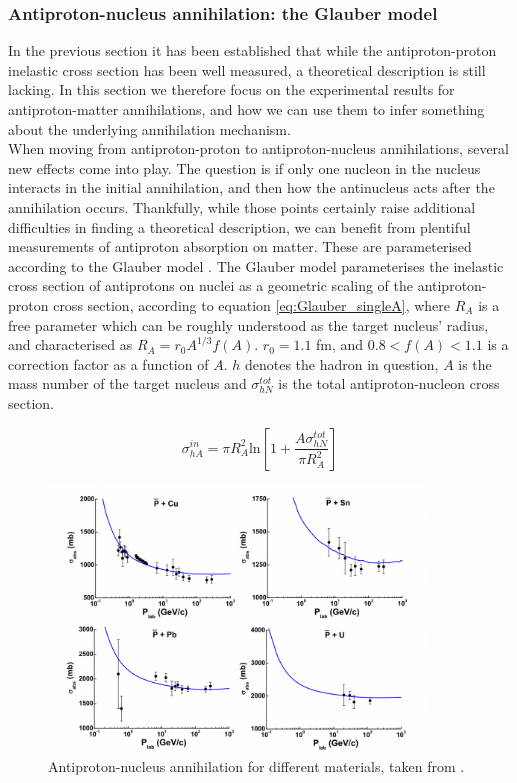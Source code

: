\subsubsection{Antiproton-nucleus annihilation: the Glauber model}\label{sec:Intro:Glauber}
In the previous section it has been established that while the antiproton-proton inelastic cross section has been well measured, a theoretical description is still lacking. In this section we therefore focus on the experimental results for antiproton-matter annihilations, and how we can use them to infer something about the underlying annihilation mechanism. \\

When moving from antiproton-proton to antiproton-nucleus annihilations, several new effects come into play. The question is if only one nucleon in the nucleus interacts in the initial annihilation, and then how the antinucleus acts after the annihilation occurs. Thankfully, while those points certainly raise additional difficulties in finding a theoretical description, we can benefit from plentiful measurements of antiproton absorption on matter. These are parameterised according to the Glauber model \cite{Glauber_original, glauber_model_geant4_scaling, Antinucleus-nucleus_Geant4}. The Glauber model parameterises the inelastic cross section of antiprotons on nuclei as a geometric scaling of the antiproton-proton cross section, according to equation \ref{eq:Glauber_singleA}, where $R_A$ is a free parameter which can be roughly understood as the target nucleus' radius, and characterised as $R_A = r_0 A^{1/3}f(A)$. $r_0=1.1$ fm, and $0.8<f(A)<1.1$ is a correction factor as a function of $A$. $h$ denotes the hadron in question, $A$ is the mass number of the target nucleus and $\sigma_{hN}^{tot}$ is the total antiproton-nucleon cross section. 

\begin{equation}\label{eq:Glauber_singleA}
    \sigma_{hA}^{in} = \pi R_A^2 \mathrm{ln}\left[ 1+\frac{A\sigma_{hN}^{tot}}{\pi R_A^2}\right]
\end{equation}

\begin{figure}
    \centering
    \includegraphics[width=0.9\textwidth]{figures/pbar_annihilation_diff_materials.png}
    \caption{Antiproton-nucleus annihilation for different materials, taken from \cite{Antinucleus-nucleus_Geant4}.}
    \label{fig:pbar_diff_materials}
\end{figure}


